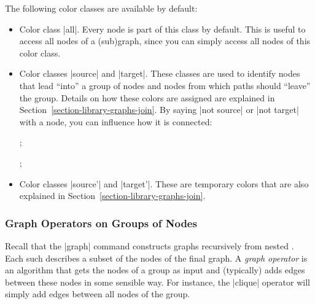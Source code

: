 The following color classes are available by default:
%
\begin{itemize}
    \item Color class |all|. Every node is part of this class by default. This
        is useful to access all nodes of a (sub)graph, since you can simply
        access all nodes of this color class.
    \item Color classes |source| and |target|. These classes are used to
        identify nodes that lead ``into'' a group of nodes and nodes from which
        paths should ``leave'' the group. Details on how these colors are
        assigned are explained in Section~\ref{section-library-graphs-join}. By
        saying |not source| or |not target| with a node, you can influence how
        it is connected:
\begin{codeexample}[preamble={\usetikzlibrary{graphs}}]
\tikz {};
\end{codeexample}
\begin{codeexample}[preamble={\usetikzlibrary{graphs}}]
\tikz {};
\end{codeexample}
    \item Color classes |source'| and |target'|. These are temporary colors
        that are also explained in Section~\ref{section-library-graphs-join}.
\end{itemize}


\subsubsection{Graph Operators on Groups of Nodes}

Recall that the |graph| command constructs graphs recursively from nested
. Each such  describes a
subset of the nodes of the final graph. A \emph{graph operator} is an algorithm
that gets the nodes of a group as input and (typically) adds edges between
these nodes in some sensible way. For instance, the |clique| operator will
simply add edges between all nodes of the group.

